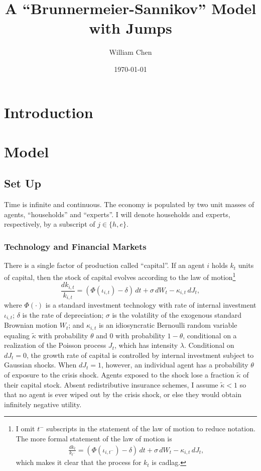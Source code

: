 \documentclass[12 pt, oneside]{article}
\theoremstyle{definition}
\theoremstyle{definition}
\theoremstyle{definition}
\begin{document}
\title{A ``Brunnermeier-Sannikov'' Model with Jumps}
\author{William Chen}
\date{\today}
\maketitle

\section{Introduction}
\label{sec:intro}


\section{Model}
\label{sec:model}

\subsection{Set Up}
Time is infinite and continuous. The economy is populated by two unit masses of agents, ``households'' and ``experts''.
I will denote households and experts, respectively, by a subscript of $j\in \{h, e\}$.

\subsubsection{Technology and Financial Markets}
There is a single factor of production called ``capital''. If an agent $i$ holds $k_t$ units of capital, then the stock of capital
evolves according to the law of motion\footnote{I omit $t^-$ subscripts in the statement of the law of motion to reduce notation. The more formal
statement of the law of motion is
\begin{align*}
  \frac{dk_t }{k_{t^-}} = (\Phi(\iota_{i, t^-}) - \delta)\, dt + \sigma\, dW_t - \kappa_{i, t}\, dJ_t,
\end{align*}
which makes it clear that the process for $k_t$ is cadlag.}
\begin{equation}
  \label{eq:capital indiv law of motion}
  \frac{dk_{i, t}}{k_{i, t}} = (\Phi(\iota_{i, t}) - \delta)\, dt + \sigma\, dW_t - \kappa_{i, t} \, dJ_t,
\end{equation}
where $\Phi(\cdot)$ is a standard investment technology with rate of internal investment $\iota_{i, t}$;
$\delta$ is the rate of depreciation; $\sigma$ is the volatility
of the exogenous standard Brownian motion $W_t$; and
$\kappa_{i, t}$ is an idiosyncratic Bernoulli random variable equaling $\tilde{\kappa}$ with probability $\theta$
and $0$ with probability $1 - \theta$, conditional on a realization of the Poisson process $J_t$, which has intensity $\lambda$.
Conditional on $dJ_t = 0$, the growth rate of capital is controlled by internal investment subject to Gaussian shocks. When $dJ_t = 1$, however,
an individual agent has a probability $\theta$ of exposure to the crisis shock. Agents exposed to the shock lose a fraction $\tilde{\kappa}$ of their capital stock.
Absent redistributive insurance schemes, I assume $\tilde{\kappa} < 1$ so that no agent is ever wiped out by the crisis shock, or else they would obtain
infinitely negative utility.
\end{document}
